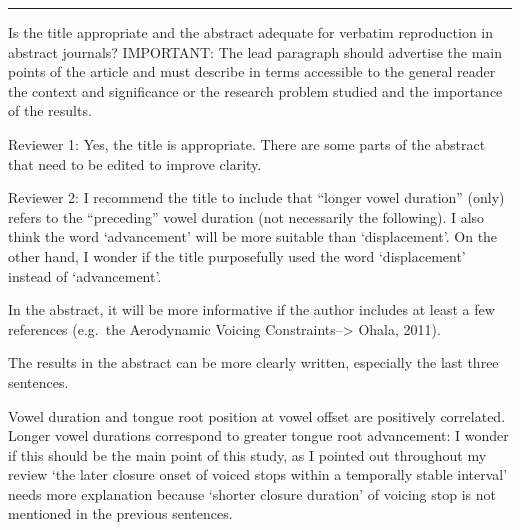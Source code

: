 \documentclass[]{article}
\begin{document}
\par

\noindent

\rule{\textwidth}{0.4pt}

Is the title appropriate and the abstract adequate for verbatim
reproduction in abstract journals? IMPORTANT: The lead paragraph should
advertise the main points of the article and must describe in terms
accessible to the general reader the context and significance or the
research problem studied and the importance of the results.

Reviewer 1: Yes, the title is appropriate. There are some parts of the
abstract that need to be edited to improve clarity.

Reviewer 2: I recommend the title to include that ``longer vowel
duration'' (only) refers to the ``preceding'' vowel duration (not
necessarily the following). I also think the word `advancement' will be
more suitable than `displacement'. On the other hand, I wonder if the
title purposefully used the word `displacement' instead of
`advancement'.

In the abstract, it will be more informative if the author includes at
least a few references (e.g.~the Aerodynamic Voicing
Constraints--\textgreater{} Ohala, 2011).

The results in the abstract can be more clearly written, especially the
last three sentences.

Vowel duration and tongue root position at vowel offset are positively
correlated. Longer vowel durations correspond to greater tongue root
advancement: I wonder if this should be the main point of this study, as
I pointed out throughout my review `the later closure onset of voiced
stops within a temporally stable interval' needs more explanation
because `shorter closure duration' of voicing stop is not mentioned in
the previous sentences.
\end{document}
